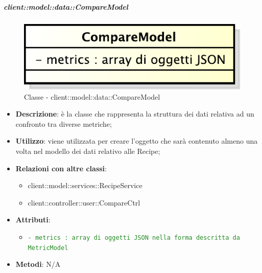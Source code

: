 
		\subparagraph{client::model::data::CompareModel} %
		\label{subp:client_model_data_comparemodel}
			\begin{figure}[htbp]
				\centering
				\centerline{\includegraphics[scale=0.7]{./images/client/classes/model/compare_model.pdf}}
				\caption{Classe - client::model::data::CompareModel}
			\end{figure}
			\begin{itemize}
				\item \textbf{Descrizione}: è la classe che rappresenta la struttura dei dati relativa ad un confronto tra diverse metriche;
				\item \textbf{Utilizzo}: viene utilizzata per creare l'oggetto che sarà contenuto almeno una volta nel modello dei dati relativo alle Recipe;
				\item \textbf{Relazioni con altre classi}:
					\begin{itemize}
						\item client::model::services::RecipeService
						\item client::controller::user::CompareCtrl
					\end{itemize}
				\item \textbf{Attributi}:
					\begin{itemize}
						\item \textcolor{forestgreen}{\texttt{- metrics : array di oggetti JSON nella forma descritta da MetricModel}}
					\end{itemize}
				\item \textbf{Metodi}: N/A
			\end{itemize}

